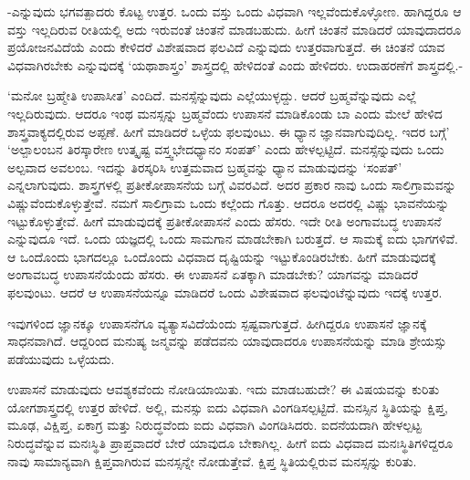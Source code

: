 -ಎನ್ನುವುದು ಭಗವತ್ಪಾದರು ಕೊಟ್ಟ ಉತ್ತರ. ಒಂದು ವಸ್ತು ಒಂದು ವಿಧವಾಗಿ ಇಲ್ಲವೆಂದುಕೊಳ್ಳೋಣ. ಹಾಗಿದ್ದರೂ ಆ ವಸ್ತು ಇಲ್ಲದಿರುವ ರೀತಿಯಲ್ಲಿ ಅದು ಇರುವಂತೆ ಚಿಂತನೆ ಮಾಡಬಹುದು. ಹೀಗೆ ಚಿಂತನೆ ಮಾಡಿದರೆ ಯಾವುದಾದರೂ ಪ್ರಯೋಜನವಿದೆಯೆ ಎಂದು ಕೇಳಿದರೆ ವಿಶೇಷವಾದ ಫಲವಿದೆ ಎನ್ನುವುದು ಉತ್ತರವಾಗುತ್ತದೆ. ಈ ಚಿಂತನೆ ಯಾವ ವಿಧವಾಗಿರಬೇಕು ಎನ್ನುವುದಕ್ಕೆ `ಯಥಾಶಾಸ್ತ್ರಂ' ಶಾಸ್ತ್ರದಲ್ಲಿ ಹೇಳಿದಂತೆ ಎಂದು ಹೇಳಿದರು. ಉದಾಹರಣೆಗೆ ಶಾಸ್ತ್ರದಲ್ಲಿ.- 

`ಮನೋ ಬ್ರಹ್ಮೇತಿ ಉಪಾಸೀತ' ಎಂದಿದೆ. ಮನಸ್ಸೆನ್ನುವುದು ಎಲ್ಲೆಯುಳ್ಳದ್ದು. ಆದರೆ ಬ್ರಹ್ಮವೆನ್ನುವುದು ಎಲ್ಲೆ ಇಲ್ಲದಿರುವುದು. ಆದರೂ ಇಂಥ ಮನಸ್ಸನ್ನು ಬ್ರಹ್ಮವೆಂದು ಉಪಾಸನೆ ಮಾಡಿಕೊಂಡು ಬಾ ಎಂದು ಮೇಲೆ ಹೇಳಿದ ಶಾಸ್ತ್ರವಾಕ್ಯದಲ್ಲಿರುವ ಅಪ್ಪಣೆ. ಹೀಗೆ ಮಾಡಿದರೆ ಒಳ್ಳೆಯ ಫಲವುಂಟು. ಈ ಧ್ಯಾನ ಜ್ಞಾನವಾಗುವುದಿಲ್ಲ. ಇದರ ಬಗ್ಗೆ' `ಅಲ್ಪಾಲಂಬನ ತಿರಸ್ಕಾರೇಣ ಉತ್ಕೃಷ್ಟ ವಸ್ತ್ವಭೇದಧ್ಯಾನಂ ಸಂಪತ್' ಎಂದು ಹೇಳಲ್ಪಟ್ಟಿದೆ. ಮನಸ್ಸೆನ್ನುವುದು ಒಂದು ಅಲ್ಪವಾದ ಅವಲಂಬ. ಇದನ್ನು ತಿರಸ್ಕರಿಸಿ ಉತ್ತಮವಾದ ಬ್ರಹ್ಮವನ್ನು ಧ್ಯಾನ ಮಾಡುವುದನ್ನು `ಸಂಪತ್' ಎನ್ನಲಾಗುವುದು. ಶಾಸ್ತ್ರಗಳಲ್ಲಿ ಪ್ರತೀಕೋಪಾಸನೆಯ ಬಗ್ಗೆ ವಿವರವಿದೆ. ಅದರ ಪ್ರಕಾರ ನಾವು ಒಂದು ಸಾಲಿಗ್ರಾಮವನ್ನು ವಿಷ್ಣುವೆಂದುಕೊಳ್ಳುತ್ತೇವೆ. ನಮಗೆ ಸಾಲಿಗ್ರಾಮ ಒಂದು ಕಲ್ಲೆಂದು ಗೊತ್ತು. ಆದರೂ ಅದರಲ್ಲಿ ವಿಷ್ಣು ಭಾವನೆಯನ್ನು ಇಟ್ಟುಕೊಳ್ಳುತ್ತೇವೆ. ಹೀಗೆ ಮಾಡುವುದಕ್ಕೆ ಪ್ರತೀಕೋಪಾಸನೆ ಎಂದು ಹೆಸರು. ಇದೇ ರೀತಿ ಅಂಗಾವಬದ್ಧ ಉಪಾಸನೆ ಎನ್ನುವುದೂ ಇದೆ. ಒಂದು ಯಜ್ಞದಲ್ಲಿ ಒಂದು ಸಾಮಗಾನ ಮಾಡಬೇಕಾಗಿ ಬರುತ್ತದೆ. ಆ ಸಾಮಕ್ಕೆ ಐದು ಭಾಗಗಳಿವೆ. ಆ ಒಂದೊಂದು ಭಾಗದಲ್ಲೂ ಒಂದೊಂದು ವಿಧವಾದ ದೃಷ್ಟಿಯನ್ನು ಇಟ್ಟುಕೊಂಡಿರಬೇಕು. ಹೀಗೆ ಮಾಡುವುದಕ್ಕೆ ಅಂಗಾವಬದ್ಧ ಉಪಾಸನೆಯೆಂದು ಹೆಸರು. ಈ ಉಪಾಸನೆ ಏತಕ್ಕಾಗಿ ಮಾಡಬೇಕು? ಯಾಗವನ್ನು ಮಾಡಿದರೆ ಫಲವುಂಟು. ಆದರೆ ಆ ಉಪಾಸನೆಯನ್ನೂ ಮಾಡಿದರೆ ಒಂದು ವಿಶೇಷವಾದ ಫಲವುಂಟೆನ್ನುವುದು ಇದಕ್ಕೆ ಉತ್ತರ.

ಇವುಗಳಿಂದ ಜ್ಞಾನಕ್ಕೂ ಉಪಾಸನೆಗೂ ವ್ಯತ್ಯಾಸವಿದೆಯೆಂದು ಸ್ಪಷ್ಟವಾಗುತ್ತದೆ. ಹೀಗಿದ್ದರೂ ಉಪಾಸನೆ ಜ್ಞಾನಕ್ಕೆ ಸಾಧನವಾಗಿದೆ. ಆದ್ದರಿಂದ ಮನುಷ್ಯ ಜನ್ಮವನ್ನು ಪಡೆದವನು ಯಾವುದಾದರೂ ಉಪಾಸನೆಯನ್ನು ಮಾಡಿ ಶ್ರೇಯಸ್ಸು ಪಡೆಯುವುದು ಒಳ್ಳೆಯದು.

ಉಪಾಸನೆ ಮಾಡುವುದು ಆವಶ್ಯಕವೆಂದು ನೋಡಿಯಾಯಿತು. ಇದು ಮಾಡಬಹುದೇ? ಈ ವಿಷಯವನ್ನು ಕುರಿತು ಯೋಗಶಾಸ್ತ್ರದಲ್ಲಿ ಉತ್ತರ ಹೇಳಿದೆ. ಅಲ್ಲಿ, ಮನಸ್ಸು ಐದು ವಿಧವಾಗಿ ವಿಂಗಡಿಸಲ್ಪಟ್ಟಿದೆ. ಮನಸ್ಸಿನ ಸ್ಥಿತಿಯನ್ನು ಕ್ಷಿಪ್ತ, ಮೂಢ, ವಿಕ್ಷಿಪ್ತ, ಏಕಾಗ್ರ ಮತ್ತು ನಿರುದ್ಧವೆಂದು ಐದು ವಿಧವಾಗಿ ವಿಂಗಡಿಸಿದರು. ಐದನೆಯದಾಗಿ ಹೇಳಲ್ಪಟ್ಟ ನಿರುದ್ಧವೆನ್ನುವ ಮನಃಸ್ಥಿತಿ ಪ್ರಾಪ್ತವಾದರೆ ಬೇರೆ ಯಾವುದೂ ಬೇಕಾಗಿಲ್ಲ. ಹೀಗೆ ಐದು ವಿಧವಾದ ಮನಃಸ್ಥಿತಿಗಳಿದ್ದರೂ ನಾವು ಸಾಮಾನ್ಯವಾಗಿ ಕ್ಷಿಪ್ತವಾಗಿರುವ ಮನಸ್ಸನ್ನೇ ನೋಡುತ್ತೇವೆ. ಕ್ಷಿಪ್ತ ಸ್ಥಿತಿಯಲ್ಲಿರುವ ಮನಸ್ಸನ್ನು ಕುರಿತು.

